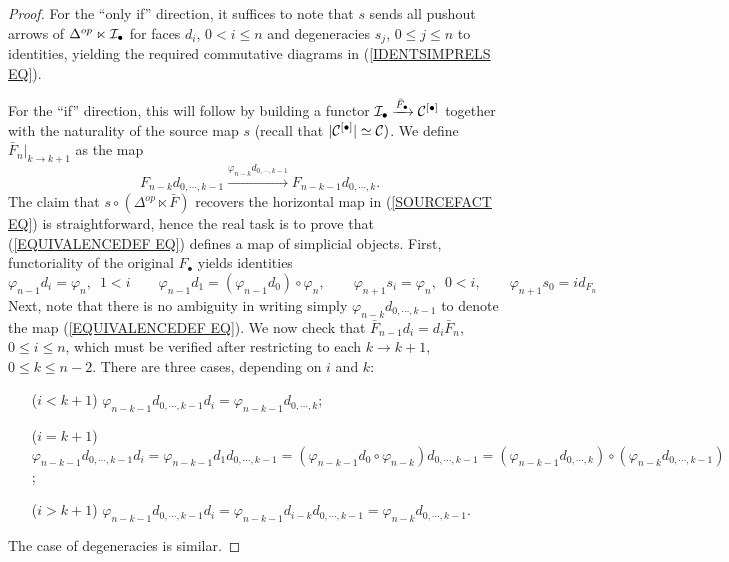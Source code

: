 \documentclass[a4paper,10pt]{article}%
\begin{document}
\begin{proof}
For the ``only if'' direction, it suffices to note that $s$ sends all pushout arrows of $\Delta^{op} \ltimes \mathcal{I}_{\bullet}$ for faces $d_i$, $0<i\leq n$ and degeneracies
$s_j$, $0\leq j \leq n$ to identities,
yielding the required commutative diagrams in (\ref{IDENTSIMPRELS EQ}).

For the ``if''  direction, this will follow by building a 
functor
$\mathcal{I}_{\bullet} \xrightarrow{\bar{F}_{\bullet}} \mathcal{C}^{[\bullet]}$ together with the naturality of the source map $s$ (recall that $|\mathcal{C}^{[\bullet]}|\simeq \mathcal{C})$. We define
$\bar{F}_n|_{k \to k+1}$ as the map
\begin{equation}\label{EQUIVALENCEDEF EQ}
F_{n-k} d_{0,\cdots,k-1}
	\xrightarrow{\varphi_{n-k} d_{0,\cdots,k-1}}
F_{n-k-1} d_{0,\cdots,k}.
\end{equation}
The claim that $s \circ (\Delta^{op} \ltimes \bar{F})$ recovers the horizontal map in (\ref{SOURCEFACT EQ}) is straightforward, hence the real task is to prove that (\ref{EQUIVALENCEDEF EQ}) defines a map of simplicial objects.
First, functoriality of the original $F_{\bullet}$
yields identities
\[
	\varphi_{n-1}d_i = \varphi_n,\phantom{1}1<i
		\qquad
	\varphi_{n-1}d_1 = (\varphi_{n-1}d_0) \circ \varphi_n,
		\qquad
	\varphi_{n+1} s_i = \varphi_{n},\phantom{1}0<i,
		\qquad
	\varphi_{n+1} s_{0} =id_{F_{n}}
\]
Next, note that there is no ambiguity in writing simply 
$\varphi_{n-k} d_{0,\cdots,k-1}$
to denote the map (\ref{EQUIVALENCEDEF EQ}).
We now check that $\bar{F}_{n-1} d_i = d_i \bar{F}_n$, $0 \leq i \leq n$, which must be verified after restricting to each $k \to k+1$, $0\leq k \leq n-2$. There are three cases, depending on $i$ and $k$:
\begin{itemize}
	\item[($i <k+1$)] 
	$\varphi_{n-k-1} d_{0,\cdots,k-1} d_i =
	\varphi_{n-k-1} d_{0,\cdots,k}$;
	\item[($i=k+1$)] 
	$\varphi_{n-k-1} d_{0,\cdots,k-1} d_i =
	\varphi_{n-k-1} d_1 d_{0,\cdots,k-1}=
	(\varphi_{n-k-1} d_0 \circ \varphi_{n-k})d_{0,\cdots,k-1}=
	(\varphi_{n-k-1}d_{0,\cdots,k})\circ(\varphi_{n-k}d_{0,\cdots,k-1})
	$;
	\item[($i>k+1$)] 
	$\varphi_{n-k-1} d_{0,\cdots,k-1} d_i =
	\varphi_{n-k-1} d_{i-k} d_{0,\cdots,k-1} =
	\varphi_{n-k}d_{0,\cdots,k-1}$.
\end{itemize}
The case of degeneracies is similar.
\end{proof}
\end{document}
